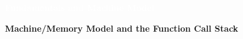 \documentclass[7pt, twocolumn]{extarticle}
\newcommand{\myinline}[1]{\lstinline[basicstyle={\fontsize{5pt}{6}\ttfamily}]{#1}}
\begin{document}
\begin{small}
\RaggedRight 
\raggedbottom


\begin{tcolorbox}[boxrule=0pt,left=1mm,right=1mm,top=0.75mm,bottom=0.75mm,boxsep=0mm,colback=red!75!offblack,frame empty,arc=0mm,fontupper=\large\sffamily\bfseries]
\begin{center}
\small{\textcolor{white}{\textbf{Fundamentals and Machine Model}}}
\end{center}
\end{tcolorbox}
        




\textcolor{headcolor}{\textbf{Machine/Memory Model and the Function Call Stack}}


\end{small}
\end{document}
